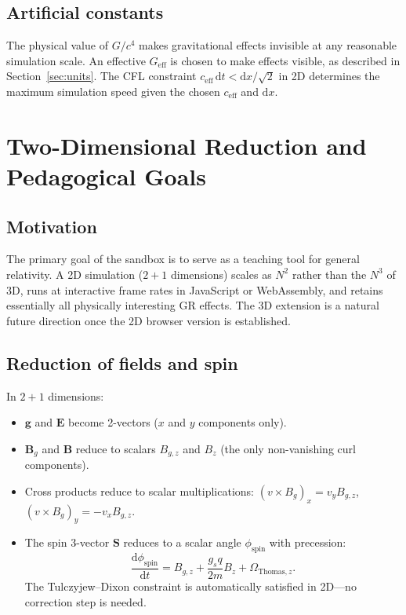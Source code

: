 \documentclass[11pt,a4paper]{article}
\newcommand{\vv}[1]{\mathbf{#1}}
\newcommand{\dd}{\mathrm{d}}
\begin{document}
\subsection{Artificial constants}

The physical value of $G/c^4$ makes gravitational effects invisible at any reasonable simulation scale.  An effective $G_{\mathrm{eff}}$ is chosen to make effects visible, as described in Section~\ref{sec:units}.  The CFL constraint $c_{\mathrm{eff}}\,\dd t < \dd x/\sqrt{2}$ in 2D determines the maximum simulation speed given the chosen $c_{\mathrm{eff}}$ and $\dd x$.

\section{Two-Dimensional Reduction and Pedagogical Goals}

\subsection{Motivation}

The primary goal of the sandbox is to serve as a teaching tool for general relativity.  A 2D simulation ($2+1$ dimensions) scales as $N^2$ rather than the $N^3$ of 3D, runs at interactive frame rates in JavaScript or WebAssembly, and retains essentially all physically interesting GR effects.  The 3D extension is a natural future direction once the 2D browser version is established.

\subsection{Reduction of fields and spin}

In $2+1$ dimensions:
\begin{itemize}
  \item $\vv{g}$ and $\vv{E}$ become 2-vectors ($x$ and $y$ components only).
  \item $\vv{B}_g$ and $\vv{B}$ reduce to scalars $B_{g,z}$ and $B_z$ (the only non-vanishing curl components).
  \item Cross products reduce to scalar multiplications: $(v\times B_g)_x = v_y B_{g,z}$, $(v\times B_g)_y = -v_x B_{g,z}$.
  \item The spin 3-vector $\vv{S}$ reduces to a scalar angle $\phi_{\mathrm{spin}}$ with precession:
  \begin{equation}
    \frac{\dd\phi_{\mathrm{spin}}}{\dd t} = B_{g,z} + \frac{g_s q}{2m}B_z + \Omega_{\mathrm{Thomas},z}.
  \end{equation}
  The Tulczyjew--Dixon constraint is automatically satisfied in 2D---no correction step is needed.
\end{itemize}
\end{document}
